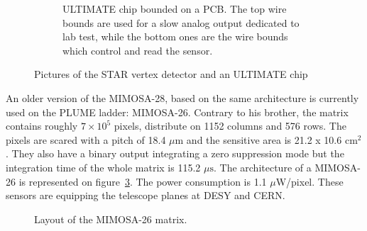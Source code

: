 \begin{figure}[!h]
\begin{subfigure}[t]{0.3\textwidth}
        \caption{ULTIMATE chip bounded on a PCB. The top wire bounds are used for a slow analog output dedicated to lab test, while the bottom ones are the wire bounds which control and read the sensor. }
        \label{fig:ultimate}
    \end{subfigure}
    \caption{Pictures of the STAR vertex detector and an ULTIMATE chip}\label{fig:Mi28}
    \end{figure}    

An older version of the \gls{MIMOSA}-28, based on the same architecture is currently used on the \gls{PLUME} ladder: \gls{MIMOSA}-26.
    Contrary to his brother, the matrix contains roughly $7 \times 10^5$ pixels, distribute on 1152 columns and 576 rows.
    The pixels are scared with a pitch of 18.4 $\mu\text{m}$ and the sensitive area is 21.2 x 10.6 $\text{cm}^2$.
    They also have a binary output integrating a zero suppression mode but the integration time of the whole matrix is 115.2 $\mu\text{s}$.
    The architecture of a \gls{MIMOSA}-26 is represented on figure~\ref{fig:archMi26}.
    The power consumption is 1.1 $\mu$W/pixel.
    These sensors are equipping the telescope planes at DESY and CERN.

    \begin{figure}[!h]
      \label{fig:archMi26}
      \caption{Layout of the MIMOSA-26 matrix.}
    \end{figure}
    


